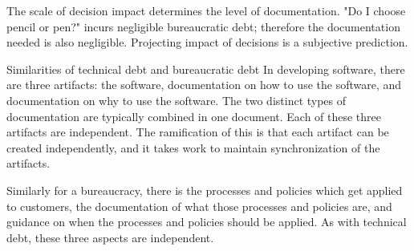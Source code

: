 The scale of decision impact determines the level of documentation. "Do I choose pencil or pen?" incurs negligible bureaucratic debt; therefore the documentation needed is also negligible. Projecting impact of decisions is a subjective prediction. 

Similarities of technical debt and bureaucratic debt
In developing software, there are three artifacts: the software, documentation on how to use the software, and documentation on why to use the software. The two distinct types of documentation are typically combined in one document. Each of these three artifacts are independent. The ramification of this is that each artifact can be created independently, and it takes work to maintain synchronization of the artifacts. 

Similarly for a bureaucracy, there is the processes and policies which get applied to customers, the documentation of what those processes and policies are, and guidance on when the processes and policies should be applied. As with technical debt, these three aspects are independent. 
